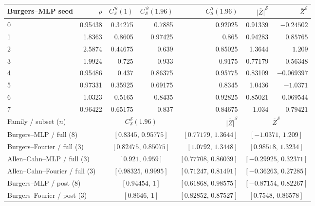 \begin{table}[!tb]
\centering\small\setlength{\tabcolsep}{4pt}
\begin{tabular}{@{}lrrrrrr@{}}
\toprule
Burgers--MLP seed & $\rho$ & $C^{\mathcal B}_{\mathcal S}(1)$ & $C^{\mathcal B}_{\mathcal S}(1.96)$ & $C^{\mathcal S}_{\mathcal S}(1.96)$ & $\overline{|Z|}^{\mathcal S}$ & $\overline Z^{\mathcal S}$\\
\midrule
0 & 0.95438 & 0.34275 & 0.7885 & 0.92025 & 0.91339 & $-0.24502$ \\
1 & 1.8363 & 0.8605 & 0.97425 & 0.865 & 0.94283 & $0.85765$ \\
2 & 2.5874 & 0.44675 & 0.639 & 0.85025 & 1.3644 & $1.209$ \\
3 & 1.9924 & 0.725 & 0.933 & 0.9175 & 0.77179 & $0.56348$ \\
4 & 0.95486 & 0.437 & 0.86375 & 0.95775 & 0.83109 & $-0.069397$ \\
5 & 0.97331 & 0.35925 & 0.69175 & 0.8345 & 1.0436 & $-1.0371$ \\
6 & 1.0323 & 0.5165 & 0.8435 & 0.92825 & 0.85021 & $0.069544$ \\
7 & 0.96422 & 0.65175 & 0.837 & 0.84675 & 1.034 & $0.79421$ \\
\midrule
\multicolumn{2}{l}{Family / subset ($n$)} & \multicolumn{2}{c}{$C^{\mathcal S}_{\mathcal S}(1.96)$} & $\overline{|Z|}^{\mathcal S}$ & \multicolumn{2}{c}{$\overline Z^{\mathcal S}$}\\
\midrule
\multicolumn{2}{l}{Burgers--MLP / full ($8$)} & \multicolumn{2}{c}{$[0.8345,\,0.95775]$} & $[0.77179,\,1.3644]$ & \multicolumn{2}{c}{$[-1.0371,\,1.209]$} \\
\multicolumn{2}{l}{Burgers--Fourier / full ($3$)} & \multicolumn{2}{c}{$[0.82475,\,0.85075]$} & $[1.0792,\,1.3448]$ & \multicolumn{2}{c}{$[0.98518,\,1.3234]$} \\
\multicolumn{2}{l}{Allen--Cahn--MLP / full ($3$)} & \multicolumn{2}{c}{$[0.921,\,0.959]$} & $[0.77708,\,0.86039]$ & \multicolumn{2}{c}{$[-0.29925,\,0.32371]$} \\
\multicolumn{2}{l}{Allen--Cahn--Fourier / full ($3$)} & \multicolumn{2}{c}{$[0.98325,\,0.9995]$} & $[0.71247,\,0.81491]$ & \multicolumn{2}{c}{$[-0.36263,\,0.27285]$} \\
\multicolumn{2}{l}{Burgers--MLP / post ($8$)} & \multicolumn{2}{c}{$[0.94454,\,1]$} & $[0.61868,\,0.98575]$ & \multicolumn{2}{c}{$[-0.87154,\,0.82267]$} \\
\multicolumn{2}{l}{Burgers--Fourier / post ($3$)} & \multicolumn{2}{c}{$[0.8646,\,1]$} & $[0.82852,\,0.87527]$ & \multicolumn{2}{c}{$[0.7548,\,0.86578]$} \\

\end{tabular}
\end{table}
